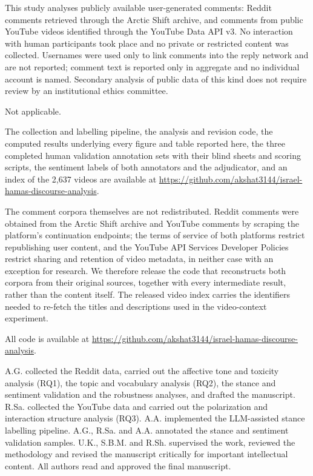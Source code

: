 \documentclass[pdflatex,sn-basic,Numbered,iicol]{sn-jnl}
\begin{document}
This study analyses publicly available user-generated comments: Reddit comments
retrieved through the Arctic Shift archive, and comments from public YouTube videos
identified through the YouTube Data API v3. No interaction with human participants
took place and no private or restricted content was collected. Usernames were
used only to link comments into the reply network and are not reported; comment
text is reported only in aggregate and no individual account is named. Secondary
analysis of public data of this kind
does not require review by an institutional ethics committee.

Not applicable.

The collection and labelling pipeline, the analysis and revision code, the
computed results underlying every figure and table reported here, the three
completed human validation annotation sets with their blind sheets and scoring
scripts, the sentiment labels of both annotators and the adjudicator, and an
index of the 2{,}637 videos are available at \url{https://github.com/akshat3144/israel-hamas-discourse-analysis}.

The comment corpora themselves are not redistributed. Reddit comments were
obtained from the Arctic Shift archive and YouTube comments by scraping the
platform's continuation endpoints; the terms of service of both platforms
restrict republishing user content, and the YouTube API Services Developer
Policies restrict sharing and retention of video metadata, in neither case with
an exception for research. We therefore release the code that reconstructs both
corpora from their original sources, together with every intermediate result,
rather than the content itself. The released video index carries the
identifiers needed to re-fetch the titles and descriptions used in the
video-context experiment.

All code is available at \url{https://github.com/akshat3144/israel-hamas-discourse-analysis}.

A.G. collected the Reddit data, carried out the affective tone and toxicity
analysis (RQ1), the topic and vocabulary analysis (RQ2), the stance and sentiment
validation and the robustness analyses, and drafted the manuscript. R.Sa. collected the YouTube
data and carried out the polarization and interaction structure analysis (RQ3).
A.A. implemented the LLM-assisted stance labelling pipeline. A.G., R.Sa. and A.A.
annotated the stance and sentiment validation samples. U.K., S.B.M. and
R.Sh. supervised the work, reviewed the methodology and revised the manuscript
critically for important intellectual content. All authors read and approved the
final manuscript.
\end{document}
